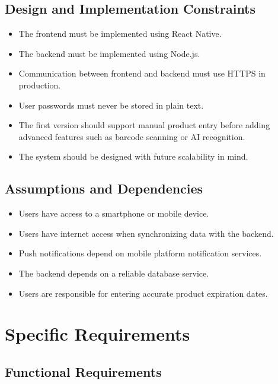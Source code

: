 \documentclass[12pt]{article}
\begin{document}
\subsection{Design and Implementation Constraints}
\begin{itemize}
    \item The frontend must be implemented using React Native.
    \item The backend must be implemented using Node.js.
    \item Communication between frontend and backend must use HTTPS in production.
    \item User passwords must never be stored in plain text.
    \item The first version should support manual product entry before adding advanced features such as barcode scanning or AI recognition.
    \item The system should be designed with future scalability in mind.
\end{itemize}

\subsection{Assumptions and Dependencies}
\begin{itemize}
    \item Users have access to a smartphone or mobile device.
    \item Users have internet access when synchronizing data with the backend.
    \item Push notifications depend on mobile platform notification services.
    \item The backend depends on a reliable database service.
    \item Users are responsible for entering accurate product expiration dates.
\end{itemize}

\section{Specific Requirements}

\subsection{Functional Requirements}
\end{document}

